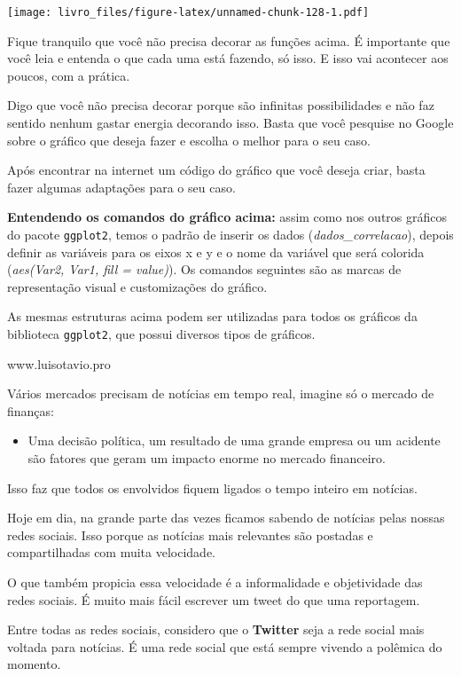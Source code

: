 \documentclass[
]{book}
\providecommand{\tightlist}{%
  \setlength{\itemsep}{0pt}\setlength{\parskip}{0pt}}
\begin{document}
\texttt{[image: livro\_files/figure-latex/unnamed-chunk-128-1.pdf]}

Fique tranquilo que você não precisa decorar as funções acima. É
importante que você leia e entenda o que cada uma está fazendo, só isso.
E isso vai acontecer aos poucos, com a prática.

Digo que você não precisa decorar porque são infinitas possibilidades e
não faz sentido nenhum gastar energia decorando isso. Basta que você
pesquise no Google sobre o gráfico que deseja fazer e escolha o melhor
para o seu caso.

Após encontrar na internet um código do gráfico que você deseja criar,
basta fazer algumas adaptações para o seu caso.

\textbf{Entendendo os comandos do gráfico acima:} assim como nos outros
gráficos do pacote \texttt{ggplot2}, temos o padrão de inserir os dados
(\emph{dados\_correlacao}), depois definir as variáveis para os eixos x
e y e o nome da variável que será colorida (\emph{aes(Var2, Var1, fill =
value)}). Os comandos seguintes são as marcas de representação visual e
customizações do gráfico.

As mesmas estruturas acima podem ser utilizadas para todos os gráficos
da biblioteca \texttt{ggplot2}, que possui diversos tipos de gráficos.

www.luisotavio.pro

Vários mercados precisam de notícias em tempo real, imagine só o mercado
de finanças:

\begin{itemize}
\tightlist
\item
  Uma decisão política, um resultado de uma grande empresa ou um
  acidente são fatores que geram um impacto enorme no mercado
  financeiro.
\end{itemize}

Isso faz que todos os envolvidos fiquem ligados o tempo inteiro em
notícias.

Hoje em dia, na grande parte das vezes ficamos sabendo de notícias pelas
nossas redes sociais. Isso porque as notícias mais relevantes são
postadas e compartilhadas com muita velocidade.

O que também propicia essa velocidade é a informalidade e objetividade
das redes sociais. É muito mais fácil escrever um tweet do que uma
reportagem.

Entre todas as redes sociais, considero que o \textbf{Twitter} seja a
rede social mais voltada para notícias. É uma rede social que está
sempre vivendo a polêmica do momento.
\end{document}
